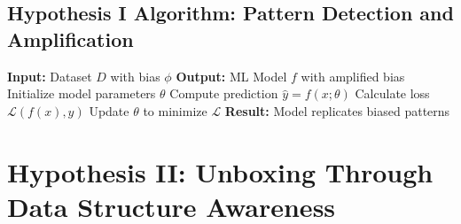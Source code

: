 \documentclass[11pt,a4paper]{article}
\begin{document}
\subsection{Hypothesis I Algorithm: Pattern Detection and Amplification}

\begin{algorithm}[H]
\caption{Biased Pattern Learning}
\begin{algorithmic}[1]
    \STATE \textbf{Input:} Dataset $D$ with bias $\phi$
    \STATE \textbf{Output:} ML Model $f$ with amplified bias
    \STATE Initialize model parameters $\theta$
            \STATE Compute prediction $\hat{y} = f(x; \theta)$
            \STATE Calculate loss $\mathcal{L}(f(x), y)$
            \STATE Update $\theta$ to minimize $\mathcal{L}$
        \ENDFOR
    \ENDFOR
    \STATE \textbf{Result:} Model replicates biased patterns
\end{algorithmic}
\end{algorithm}

\section{Hypothesis II: Unboxing Through Data Structure Awareness}
\end{document}
